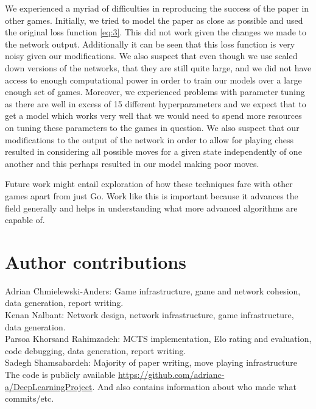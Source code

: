 \documentclass[english]{article}
\begin{document}
We experienced a myriad of difficulties in reproducing the success of the paper
in other games.
Initially, we tried to model the paper as close as possible and used the
original loss function \ref{eq:3}. This did not work given the changes we made
to the network output. Additionally it can be seen that this loss function is
very noisy given our modifications.
We also suspect that even though we use scaled down versions of the networks,
that they are still quite large, and we did not have access to enough
computational power in order to train our models over a large enough set of
games. Moreover, we experienced problems with parameter tuning as there are well
in excess of 15 different hyperparameters and we expect that to get a model
which works very well that we would need to spend more resources on tuning these
parameters to the games in question. We also suspect that our modifications to
the output of the network in order to allow for playing chess resulted in
considering all possible moves for a given state independently of one another
and this perhaps resulted in our model making poor moves.

Future work might entail exploration of how these techniques fare with other
games apart from just Go. Work like this is important because it advances the
field generally and helps in understanding what more advanced algorithms are
capable of.

\clearpage



\section{Author contributions}
Adrian Chmielewski-Anders: Game infrastructure, game and network cohesion, data
generation, report writing.\\
Kenan Nalbant: Network design, network infrastructure, game infrastructure, data generation.\\
Parsoa Khorsand Rahimzadeh: MCTS implementation, Elo rating and evaluation, code debugging, data generation, report writing.\\
Sadegh Shamsabardeh: Majority of paper writing, move playing infrastructure
The code is publicly available
\href{https://github.com/adrianc-a/DeepLearningProject}{https://github.com/adrianc-a/DeepLearningProject}.
And also contains information about who made what commits/etc.
\end{document}
